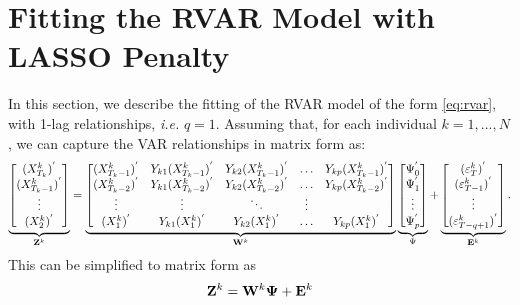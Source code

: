 \newpage

\section{Fitting the RVAR Model with LASSO Penalty}\label{section:rvar}


In this section, we describe the fitting of the RVAR model of the form \eqref{eq:rvar}, with 1-lag relationships, \textit{i.e.} $q = 1$. Assuming that, for each individual $k=1,...,N$, we can capture the VAR relationships in matrix form as:
{\footnotesize
\begin{equation*}
	\underbrace{\begin{bmatrix} 
		(X_{T_k}^k)^{'} \\ (X_{T_k-1}^k)^{'} \\ \vdots \\ (X_{2}^k)^{'}
	\end{bmatrix}}_{\mathbf{Z}^{k}} = 
	\underbrace{\begin{bmatrix} 
		(X_{T_k-1}^{k})^{'}  & Y_{k1} (X_{T_k-1}^{k})^{'} &  Y_{k2} (X_{T_k-1}^{k})^{'} & \ldots & Y_{kp} (X_{T_k-1}^{k})^{'} \\
		(X_{T_k-2}^{k})^{'}  & Y_{k1} (X_{T_k-2}^{k})^{'} &  Y_{k2} (X_{T_k-2}^{k})^{'} & \ldots & Y_{kp} (X_{T_k-2}^{k})^{'} \\
		 \vdots      &     \vdots      & \ddots & \vdots 		  \\
		(X_{1}^{k})^{'}  & Y_{k1} (X_{1}^{k})^{'} &  Y_{k2} (X_{1}^{k})^{'} & \ldots & Y_{kp} (X_{1}^{k})^{'} \\
	\end{bmatrix}}_{\mathbf{W}^k} 
	\underbrace{\begin{bmatrix}
		\Psi_{0}^{'} \\ \Psi_{1}^{'} \\ \vdots \\ \Psi_{p}^{'}
	\end{bmatrix}}_{\Psi} +  
	\underbrace{\begin{bmatrix} 
		(\varepsilon_T^{k})^{'} \\ (\varepsilon_{T-1}^{k})^{'} \\ \vdots \\ (\varepsilon_{T-q+1}^{k})^{'}
	\end{bmatrix}}_{\mathbf{E}^{k}}.
\end{equation*}
}%
This can be simplified to matrix form as
\begin{equation}\label{eq:rvar_kmat}
	\mathbf{Z}^{k} = \mathbf{W}^{k} \bm{\Psi} + \mathbf{E}^{k}
\end{equation}

